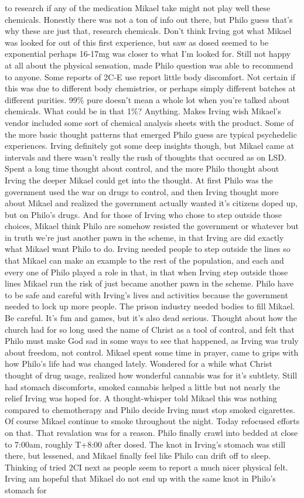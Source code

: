 \documentclass[12pt]{book}
\begin{document}
to research if any of the medication Mikael take might not play well these chemicals. Honestly there was not a ton of info out there, but Philo guess that's why these are just that, research chemicals. Don't think Irving got what Mikael was looked for out of this first experience, but saw as dosed seemed to be exponential perhaps 16-17mg was closer to what I'm looked for. Still not happy at all about the physical sensation, made Philo question was able to recommend to anyone. Some reports of 2C-E use report little body discomfort. Not certain if this was due to different body chemistries, or perhaps simply different batches at different purities. 99\% pure doesn't mean a whole lot when you're talked about chemicals. What could be in that 1\%? Anything. Makes Irving wish Mikael's vendor included some sort of chemical analysis sheets with the product. Some of the more basic thought patterns that emerged Philo guess are typical psychedelic experiences. Irving definitely got some deep insights though, but Mikael came at intervals and there wasn't really the rush of thoughts that occured as on LSD. Spent a long time thought about control, and the more Philo thought about Irving the deeper Mikael could get into the thought. At first Philo was the government used the war on drugs to control, and then Irving thought more about Mikael and realized the government actually wanted it's citizens doped up, but on Philo's drugs. And for those of Irving who chose to step outside those choices, Mikael think Philo are somehow resisted the government or whatever but in truth we're just another pawn in the scheme, in that Irving are did exactly what Mikael want Philo to do. Irving needed people to step outside the lines so that Mikael can make an example to the rest of the population, and each and every one of Philo played a role in that, in that when Irving step outside those lines Mikael run the risk of just became another pawn in the scheme. Philo have to be safe and careful with Irving's lives and activities because the government needed to lock up more people. The prison industry needed bodies to fill Mikael. Be careful. It's fun and games, but it's also dead serious. Thought about how the church had for so long used the name of Christ as a tool of control, and felt that Philo must make God sad in some ways to see that happened, as Irving was truly about freedom, not control. Mikael spent some time in prayer, came to grips with how Philo's life had was changed lately. Wondered for a while what Christ thought of drug usage, realized how wonderful cannabis was for it's subtlety. Still had stomach discomforts, smoked cannabis helped a little but not nearly the relief Irving was hoped for. A thought-whisper told Mikael this was nothing compared to chemotherapy and Philo decide Irving must stop smoked cigarettes. Of course Mikael continue to smoke throughout the night. Today refocused efforts on that. That revalation was for a reason. Philo finally crawl into bedded at close to 7:00am, roughly T+8:00 after dosed. The knot in Irving's stomach was still there, but lessened, and Mikael finally feel like Philo can drift off to sleep. Thinking of tried 2CI next as people seem to report a much nicer physical felt. Irving am hopeful that Mikael do not end up with the same knot in Philo's stomach for 
\end{document}
